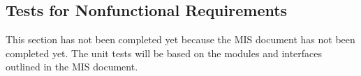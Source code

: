 \documentclass[12pt, titlepage]{article}
\begin{document}


					

					
					
					



    



\subsection{Tests for Nonfunctional Requirements}

This section has not been completed yet because the MIS document has not been
completed yet. The unit tests will be based on the modules and interfaces
outlined in the MIS document.



		
\end{document}
